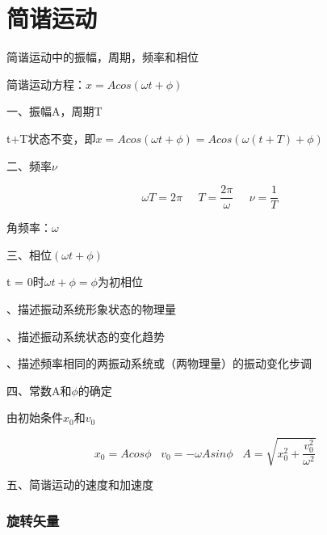 \documentclass[UTF8]{article}
\begin{document}
\section{简谐运动}

    简谐运动中的振幅，周期，频率和相位

    简谐运动方程：$x = Acos(\omega t + \phi)$

    一、振幅A，周期T

    t+T状态不变，即$x = Acos(\omega t + \phi) = Acos(\omega (t+T) + \phi)$


    二、频率$\nu$

    \[\omega T = 2\pi\;\;\;\;\;T = \frac{2\pi}{\omega}\;\;\;\;\;\nu = \frac{1}{T}\]

    \;\;角频率：$\omega $

    三、相位$(\omega t + \phi)$

    \;\;t = 0时\;\;$\omega t + \phi = \phi$为初相位

    \;、描述振动系统形象状态的物理量

    \;、描述振动系统状态的变化趋势

    \;、描述频率相同的两振动系统或（两物理量）的振动变化步调

    四、常数A和$\phi$的确定

    由初始条件$x_0\mbox{和}v_0$

    \[x_0 = Acos\phi\;\;\;v_0 = -\omega Asin\phi\;\;\;A = \sqrt{x_0^2 + \frac{v_0^2}{\omega^2}}\;\;\;\]

    五、简谐运动的速度和加速度

\subsubsection{旋转矢量}

    
\end{document}

